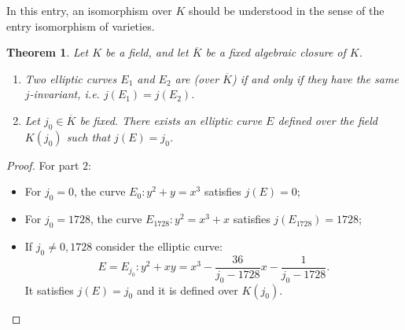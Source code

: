 \documentclass[12pt]{article}
\newtheorem{thm}{Theorem}
\begin{document}
In this entry, an isomorphism over $K$ should be understood in the sense of the entry isomorphism of varieties.

\begin{thm}
Let $K$ be a field, and let $\overline{K}$ be a fixed algebraic closure of $K$.
\begin{enumerate}
\item Two elliptic curves $E_1$ and $E_2$ are  (over $\overline{K}$) if and only if they have the same $j$-invariant, i.e. $j(E_1)=j(E_2)$.\\
\item Let $j_0\in \overline{K}$ be fixed. There exists an elliptic curve $E$ defined over the field $K(j_0)$ such that $j(E)=j_0$.
\end{enumerate}
\end{thm}

\begin{proof}
For part $2$:
\begin{itemize}
\item For $j_0=0$, the curve $E_0\colon y^2+y=x^3$ satisfies $j(E)=0$;
\item For $j_0=1728$, the curve $E_{1728} \colon y^2=x^3+x$ satisfies $j(E_{1728})=1728$;
\item If $j_0\neq 0, 1728$ consider the elliptic curve:
$$E=E_{j_0} \colon y^2+xy=x^3-\frac{36}{j_0-1728}x-\frac{1}{j_0-1728}.$$
It satisfies $j(E)=j_0$ and it is defined over $K(j_0)$.
\end{itemize}
\end{proof}
\end{document}

